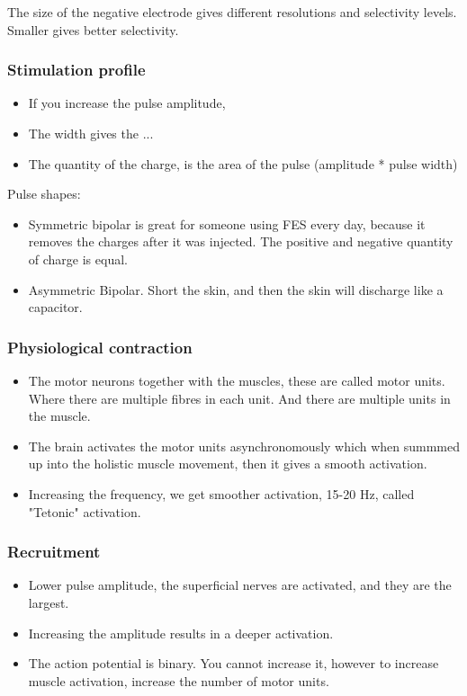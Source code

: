 \documentclass[a4paper]{article}
\begin{document}
The size of the negative electrode gives different resolutions and selectivity levels. Smaller gives better selectivity.


\subsubsection{Stimulation profile}
\begin{itemize}
	\item If you increase the pulse amplitude,  
	\item The width gives the ...
	\item The quantity of the charge, is the area of the pulse (amplitude * pulse width)
\end{itemize}

Pulse shapes:
\begin{itemize}
	\item Symmetric bipolar is great for someone using FES every day, because it removes the charges after it was injected. The positive and negative quantity of charge is equal. 
	\item Asymmetric Bipolar. Short the skin, and then the skin will discharge like a capacitor. 
\end{itemize}

\subsubsection{Physiological contraction}
\begin{itemize}
	\item The motor neurons together with the muscles, these are called motor units. Where there are multiple fibres in each unit. And there are multiple units in the muscle. 
	\item The brain activates the motor units asynchronomously which when summmed up into the holistic muscle movement, then it gives a smooth activation. 
	\item Increasing the frequency, we get smoother activation, 15-20 Hz, called "Tetonic" activation. 
\end{itemize}

\subsubsection{Recruitment}
\begin{itemize}
	\item Lower pulse amplitude, the superficial nerves are activated, and they are the largest.
	\item Increasing the amplitude results in a deeper activation. 
	\item The action potential is binary. You cannot increase it, however to increase muscle activation, increase the number of motor units. 
\end{itemize}
\end{document}
